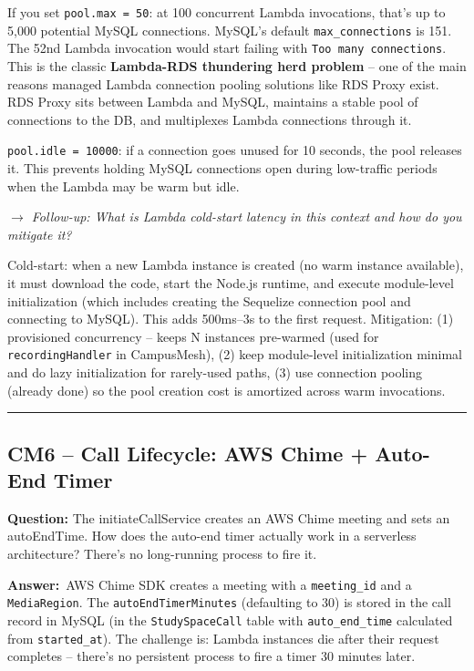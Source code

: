 \documentclass[letterpaper,10pt]{article}
\newlength{\boxwidth}
\newcommand{\questionbox}[1]{%
  \vspace{6pt}%
  \noindent\colorbox{qbg}{%
    \begin{minipage}{\boxwidth}%
      \vspace{3pt}\textbf{\textcolor{nordblue}{Question:}} #1\vspace{3pt}%
    \end{minipage}%
  }\vspace{2pt}%
}
\newcommand{\answerlabel}{\noindent\textbf{\textcolor{answerblue}{Answer:}}~}
\newcommand{\followup}[1]{\smallskip\noindent\textit{\textcolor{nordblue}{$\rightarrow$ Follow-up: #1}}\smallskip}
\begin{document}
If you set \texttt{pool.max = 50}: at 100 concurrent Lambda invocations, that's up to 5,000 potential MySQL connections. MySQL's default \texttt{max\_connections} is 151. The 52nd Lambda invocation would start failing with \texttt{Too many connections}. This is the classic \textbf{Lambda-RDS thundering herd problem} -- one of the main reasons managed Lambda connection pooling solutions like RDS Proxy exist. RDS Proxy sits between Lambda and MySQL, maintains a stable pool of connections to the DB, and multiplexes Lambda connections through it.

\texttt{pool.idle = 10000}: if a connection goes unused for 10 seconds, the pool releases it. This prevents holding MySQL connections open during low-traffic periods when the Lambda may be warm but idle.

\followup{What is Lambda cold-start latency in this context and how do you mitigate it?}

\noindent Cold-start: when a new Lambda instance is created (no warm instance available), it must download the code, start the Node.js runtime, and execute module-level initialization (which includes creating the Sequelize connection pool and connecting to MySQL). This adds 500ms--3s to the first request. Mitigation: (1) provisioned concurrency -- keeps N instances pre-warmed (used for \texttt{recordingHandler} in CampusMesh), (2) keep module-level initialization minimal and do lazy initialization for rarely-used paths, (3) use connection pooling (already done) so the pool creation cost is amortized across warm invocations.

\medskip\rule{\linewidth}{0.2pt}

\subsection*{CM6 -- Call Lifecycle: AWS Chime + Auto-End Timer}

\questionbox{The initiateCallService creates an AWS Chime meeting and sets an autoEndTime. How does the auto-end timer actually work in a serverless architecture? There's no long-running process to fire it.}

\answerlabel AWS Chime SDK creates a meeting with a \texttt{meeting\_id} and a \texttt{MediaRegion}. The \texttt{autoEndTimerMinutes} (defaulting to 30) is stored in the call record in MySQL (in the \texttt{StudySpaceCall} table with \texttt{auto\_end\_time} calculated from \texttt{started\_at}). The challenge is: Lambda instances die after their request completes -- there's no persistent process to fire a timer 30 minutes later.
\end{document}
